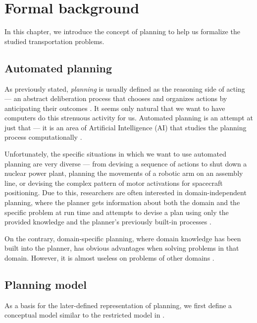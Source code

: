 \chapter{Formal background}

In this chapter, we introduce the concept of planning to help us  formalize the studied transportation problems.

\section{Automated planning}

As previously stated, \textit{planning} is usually defined as the reasoning side of acting --- an abstract deliberation
process that chooses and organizes actions by anticipating their outcomes
\citep[Section~1.1]{Ghallab2004}.
It seems only natural that we want to have computers do this strenuous activity for us.
Automated planning is an attempt at just that --- it is an area of Artificial Intelligence (AI) that
studies the planning process computationally \citep[Section~1.1]{Ghallab2004}.

Unfortunately, the specific situations in which we want to use automated planning are very diverse
--- from devising a sequence of actions to shut down a nuclear power plant,
planning the movements of a robotic arm
on an assembly line, or devising the complex pattern of motor activations
for spacecraft positioning.
Due to this, researchers are often interested in domain-independent planning,
where the planner gets information
about both the domain and the specific problem at run time and attempts to devise a plan using only the provided knowledge
and the planner's previously built-in processes \citep[Section~1.3]{Ghallab2004}.

On the contrary, domain-specific planning, where domain knowledge has been built into the planner,
has obvious advantages when solving problems in that domain. However,
it is almost useless on problems of other
domains \citep[Section~1.3]{Ghallab2004}.

\section{Planning model}

As a basis for the later-defined representation of planning, we first define
a conceptual model similar to the restricted model in \citep[Section~1.4, Section~1.5]{Ghallab2004}.

